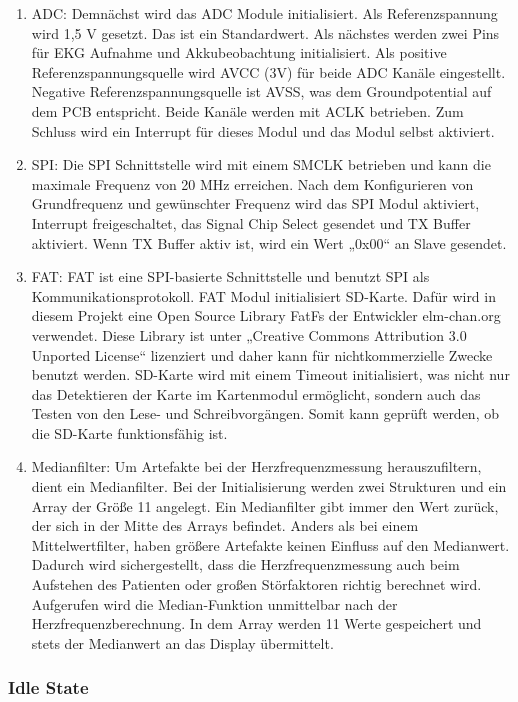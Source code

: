 \begin{enumerate}
    \item ADC: Demnächst wird das ADC Module initialisiert. Als Referenzspannung wird 1,5 V gesetzt. Das ist ein Standardwert. Als nächstes werden zwei Pins für EKG Aufnahme und Akkubeobachtung initialisiert. Als positive Referenzspannungsquelle wird AVCC (3V) für beide ADC Kanäle eingestellt. Negative Referenzspannungsquelle ist AVSS, was dem Groundpotential auf dem PCB entspricht. Beide Kanäle werden mit ACLK betrieben. Zum Schluss wird ein Interrupt für dieses Modul und das Modul selbst aktiviert.
    \item SPI: Die SPI Schnittstelle wird mit einem SMCLK betrieben und kann die maximale Frequenz von 20 MHz erreichen. Nach dem Konfigurieren von Grundfrequenz und gewünschter Frequenz wird das SPI Modul aktiviert, Interrupt freigeschaltet, das Signal Chip Select gesendet und TX Buffer aktiviert. Wenn TX Buffer aktiv ist, wird ein Wert „0x00“ an Slave gesendet. 
    \item FAT: FAT ist eine SPI-basierte Schnittstelle und benutzt SPI als Kommunikationsprotokoll. FAT Modul initialisiert SD-Karte. Dafür wird in diesem Projekt eine Open Source Library FatFs der Entwickler elm-chan.org verwendet. Diese Library ist unter „Creative Commons Attribution 3.0 Unported License“ lizenziert und daher kann für nichtkommerzielle Zwecke benutzt werden. 
    SD-Karte wird mit einem Timeout initialisiert, was nicht nur das Detektieren der Karte im Kartenmodul ermöglicht, sondern auch das Testen von den Lese- und Schreibvorgängen. Somit kann geprüft werden, ob die SD-Karte funktionsfähig ist.
    \item Medianfilter: Um Artefakte bei der Herzfrequenzmessung herauszufiltern, dient ein Medianfilter. Bei der Initialisierung werden zwei Strukturen und ein Array der Größe 11 angelegt. Ein Medianfilter gibt immer den Wert zurück, der sich in der Mitte des Arrays befindet. Anders als bei einem Mittelwertfilter, haben größere Artefakte keinen Einfluss auf den Medianwert. Dadurch wird sichergestellt, dass die Herzfrequenzmessung auch beim Aufstehen des Patienten oder großen Störfaktoren richtig berechnet wird. Aufgerufen wird die Median-Funktion unmittelbar nach der Herzfrequenzberechnung. In dem Array werden 11 Werte gespeichert und stets der Medianwert an das Display übermittelt.
\end{enumerate}

\subsubsection{Idle State}

